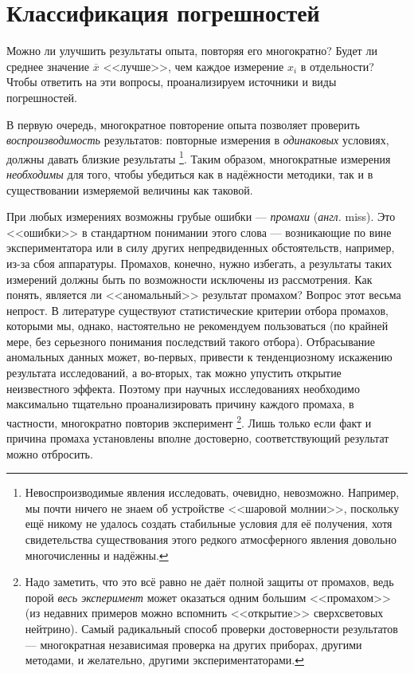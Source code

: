 \section{Классификация погрешностей}

Можно ли улучшить результаты опыта, повторяя его многократно? Будет
ли среднее значение $\overline{x}$ <<лучше>>,
чем каждое измерение $x_{i}$ в отдельности? Чтобы ответить на эти
вопросы, проанализируем источники и виды погрешностей.

В первую очередь, многократное повторение опыта позволяет проверить
\emph{воспроизводимость} результатов: повторные измерения в \emph{одинаковых}
условиях, должны давать близкие результаты \footnote{Невоспроизводимые явления исследовать, очевидно, невозможно. Например,
мы почти ничего не знаем об устройстве <<шаровой молнии>>,
поскольку ещё никому не удалось создать стабильные условия для её
получения, хотя свидетельства существования этого редкого атмосферного
явления довольно многочисленны и надёжны.}. Таким образом, многократные измерения \emph{необходимы} для того,
чтобы убедиться как в надёжности методики, так и в существовании измеряемой
величины как таковой.

При любых измерениях возможны грубые ошибки --- \emph{промахи}
(\emph{англ.} miss). Это <<ошибки>> в стандартном
понимании этого слова --- возникающие по вине экспериментатора
или в силу других непредвиденных обстоятельств, например, из-за сбоя
аппаратуры. Промахов, конечно, нужно избегать, а результаты таких
измерений должны быть по возможности исключены из рассмотрения. Как
понять, является ли <<аномальный>> результат
промахом? Вопрос этот весьма непрост. В литературе существуют статистические
критерии отбора промахов, которыми мы, однако, настоятельно не рекомендуем
пользоваться (по крайней мере, без серьезного понимания последствий
такого отбора). Отбрасывание аномальных данных может, во-первых, привести
к тенденциозному искажению результата исследований, а во-вторых, так
можно упустить открытие неизвестного эффекта. Поэтому при научных
исследованиях необходимо максимально тщательно проанализировать причину
каждого промаха, в частности, многократно повторив эксперимент \footnote{Надо заметить, что это всё равно не даёт полной защиты от промахов,
ведь порой \emph{весь эксперимент} может оказаться одним большим <<промахом>>
(из недавних примеров можно вспомнить <<открытие>>
сверхсветовых нейтрино). Самый радикальный способ проверки достоверности
результатов --- многократная независимая проверка на других
приборах, другими методами, и желательно, другими экспериментаторами.}. Лишь только если факт и причина промаха установлены вполне достоверно,
соответствующий результат можно отбросить.

